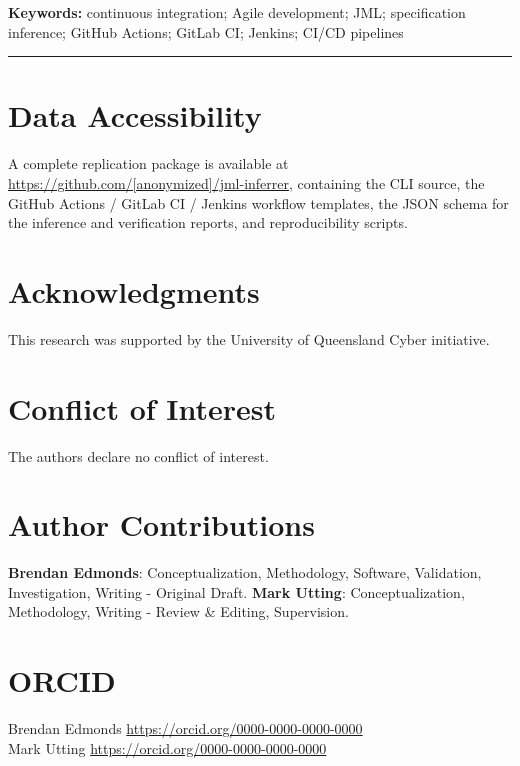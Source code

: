 \documentclass[11pt]{article}
\begin{document}
\vspace{1em}

\noindent\textbf{Keywords:} continuous integration; Agile development; JML; specification inference; GitHub Actions; GitLab CI; Jenkins; CI/CD pipelines

\vspace{1em}
\hrule
\vspace{1em}











\section*{Data Accessibility}

A complete replication package is available at \url{https://github.com/[anonymized]/jml-inferrer}, containing the CLI source, the GitHub Actions / GitLab CI / Jenkins workflow templates, the JSON schema for the inference and verification reports, and reproducibility scripts.

\section*{Acknowledgments}

This research was supported by the University of Queensland Cyber initiative.

\section*{Conflict of Interest}

The authors declare no conflict of interest.

\section*{Author Contributions}

\textbf{Brendan Edmonds}: Conceptualization, Methodology, Software, Validation, Investigation, Writing - Original Draft. \textbf{Mark Utting}: Conceptualization, Methodology, Writing - Review \& Editing, Supervision.

\section*{ORCID}

Brendan Edmonds \url{https://orcid.org/0000-0000-0000-0000}\\
Mark Utting \url{https://orcid.org/0000-0000-0000-0000}



\end{document}
